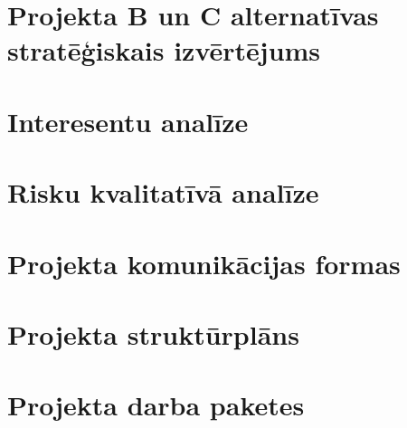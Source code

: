 \section{Projekta B un C alternatīvas stratēģiskais izvērtējums}
	\label{app:B_C_strategiskais_vertejums}
    \begin{figure}
        \centering 
        
    \end{figure}
    \clearpage


\section{Interesentu analīze}
	\label{app:Projekta_interesentu_analize}
    \begin{figure}
        \centering 
        
    \end{figure}
    \clearpage
\section{Risku kvalitatīvā analīze}
	\label{app:Projekta_risku_analize}
    \begin{figure}
        \centering 
        
    \end{figure}
    \clearpage

\section{Projekta komunikācijas formas}
	\label{app:Projekta_komunikacijas_formas}
    \begin{figure}
        \centering 
        
    \end{figure}
    \clearpage
\section{Projekta struktūrplāns}
    \begin{figure}
        \centering 
        
    \end{figure}
    \label{app:Projekta_strukturplans}
    \clearpage
\section{Projekta darba paketes}
	\label{app:Projekta_darba_paketes}
    \clearpage
